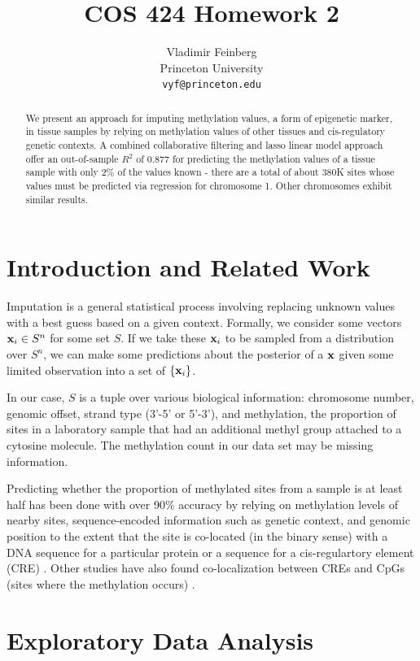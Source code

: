 \documentclass{article} %
\title{COS 424 Homework 2}
\author{
Vladimir Feinberg\\
Princeton University\\
\texttt{vyf@princeton.edu}
}
\begin{document}
\maketitle
\begin{abstract}

We present an approach for imputing methylation values, a form of epigenetic marker, in tissue samples by relying on methylation values of other tissues and cis-regulatory genetic contexts. A combined collaborative filtering and lasso linear model approach offer an out-of-sample $R^2$ of 0.877 for predicting the methylation values of a tissue sample with only 2\% of the values known - there are a total of about 380K sites whose values must be predicted via regression for chromosome 1. Other chromosomes exhibit similar results.
\end{abstract}

\section{Introduction and Related Work}

Imputation is a general statistical process involving replacing unknown values with a best guess based on a given context. Formally, we consider some vectors $\textbf{x}_i\in S^n$ for some set $S$. If we take these $\textbf{x}_i$ to be sampled from a distribution over $S^n$, we can make some predictions about the posterior of a $\textbf{x}$ given some limited observation into a set of $\{\textbf{x}_i\}$.

In our case, $S$ is a tuple over various biological information: chromosome number, genomic offset, strand type (3'-5' or 5'-3'), and methylation, the proportion of sites in a laboratory sample that had an additional methyl group attached to a cytosine molecule. The methylation count in our data set may be missing information.

Predicting whether the proportion of methylated sites from a sample is at least half has been done with over 90\% accuracy by relying on methylation levels of nearby sites, sequence-encoded information such as genetic context, and genomic position to the extent that the site is co-located (in the binary sense) with a DNA sequence for a particular protein or a sequence for a cis-regulartory element (CRE) \cite{zhang2015predicting}. Other studies have also found co-localization between CREs and CpGs (sites where the methylation occurs) \cite{ziller2013charting}.

\section{Exploratory Data Analysis}
\end{document}
